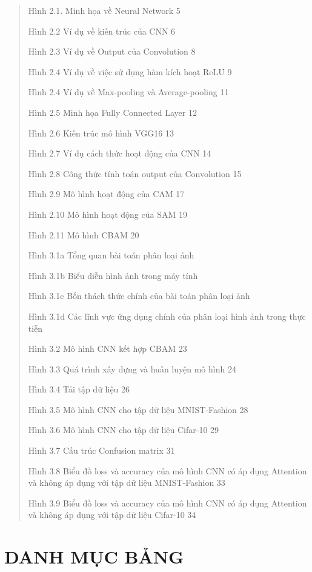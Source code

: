 \documentclass[
]{article}
\begin{document}
\begin{quote}
Hình 2.1. Minh họa về Neural Network 5

Hình 2.2 Ví dụ về kiến trúc của CNN 6

Hình 2.3 Ví dụ về Output của Convolution 8

Hình 2.4 Ví dụ về việc sử dụng hàm kích hoạt ReLU 9

Hình 2.4 Ví dụ về Max-pooling và Average-pooling 11

Hình 2.5 Minh họa Fully Connected Layer 12

Hình 2.6 Kiến trúc mô hình VGG16 13

Hình 2.7 Ví dụ cách thức hoạt động của CNN 14

Hình 2.8 Công thức tính toán output của Convolution 15

Hình 2.9 Mô hình hoạt động của CAM 17

Hình 2.10 Mô hình hoạt động của SAM 19

Hình 2.11 Mô hình CBAM 20

Hình 3.1a Tổng quan bài toán phân loại ảnh

Hình 3.1b Biểu diễn hình ảnh trong máy tính

Hình 3.1c Bốn thách thức chính của bài toán phân loại ảnh

Hình 3.1d Các lĩnh vực ứng dụng chính của phân loại hình ảnh trong thực tiễn

Hình 3.2 Mô hình CNN kết hợp CBAM 23

Hình 3.3 Quá trình xây dựng và huấn luyện mô hình 24

Hình 3.4 Tải tập dữ liệu 26

Hình 3.5 Mô hình CNN cho tập dữ liệu MNIST-Fashion 28

Hình 3.6 Mô hình CNN cho tập dữ liệu Cifar-10 29

Hình 3.7 Cấu trúc Confusion matrix 31

Hình 3.8 Biểu đồ loss và accuracy của mô hình CNN có áp dụng Attention
và không áp dụng với tập dữ liệu MNIST-Fashion 33

Hình 3.9 Biểu đồ loss và accuracy của mô hình CNN có áp dụng Attention
và không áp dụng với tập dữ liệu Cifar-10 34
\end{quote}

\section{DANH MỤC BẢNG}\label{danh-mux1ee5c-bux1ea3ng}
\end{document}

